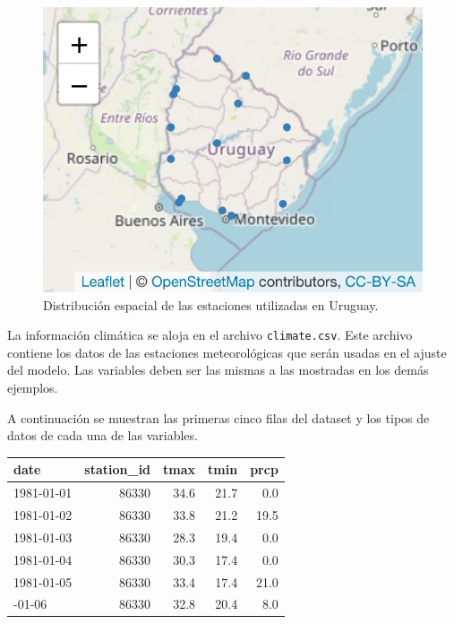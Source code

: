 \documentclass[
  12pt]{article}
\newenvironment{Shaded}{}{}
\newcommand{\DataTypeTok}[1]{\textcolor[rgb]{0.56,0.13,0.00}{#1}}
\newcommand{\KeywordTok}[1]{\textcolor[rgb]{0.00,0.44,0.13}{\textbf{#1}}}
\newcommand{\NormalTok}[1]{#1}
\newcommand{\OperatorTok}[1]{\textcolor[rgb]{0.40,0.40,0.40}{#1}}
\newcommand{\StringTok}[1]{\textcolor[rgb]{0.25,0.44,0.63}{#1}}
\begin{document}
\begin{figure}[H]

{\centering \includegraphics{Manual_Generador_files/figure-latex/mapa-estaciones-1-1} 

}

\caption{Distribución espacial de las estaciones utilizadas en Uruguay.}\label{fig:mapa-estaciones-1}
\end{figure}

La información climática se aloja en el archivo \texttt{climate.csv}. Este archivo contiene los datos de las estaciones meteorológicas que serán usadas en el ajuste del modelo. Las variables deben ser las mismas a las mostradas en los demás ejemplos.

A continuación se muestran las primeras cinco filas del dataset y los tipos de datos de cada una de las variables.

\begin{Shaded}
\end{Shaded}

\begin{table}[H]
\centering
\begin{tabular}{lrrrr}
\toprule
date & station\_id & tmax & tmin & prcp\\
\midrule
1981-01-01 & 86330 & 34.6 & 21.7 & 0.0\\
1981-01-02 & 86330 & 33.8 & 21.2 & 19.5\\
1981-01-03 & 86330 & 28.3 & 19.4 & 0.0\\
1981-01-04 & 86330 & 30.3 & 17.4 & 0.0\\
1981-01-05 & 86330 & 33.4 & 17.4 & 21.0\\
\addlinespace
1981-01-06 & 86330 & 32.8 & 20.4 & 8.0\\
\bottomrule
\end{tabular}
\end{table}
\end{document}
